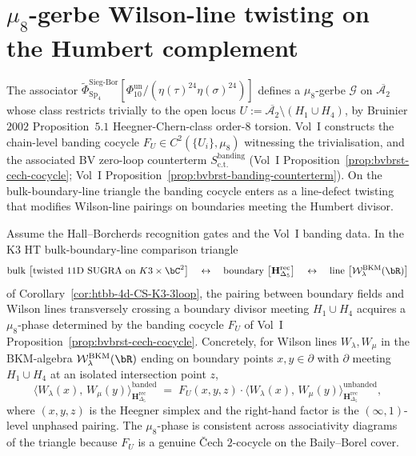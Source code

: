 \section{$\mu_8$-gerbe Wilson-line twisting on the Humbert complement}
\label{sec:htbb-mu8-wilson-twisting}

The associator
$\widetilde{\Phi}^{\mathrm{Sieg\text{-}Bor}}_{\mathrm{Sp}_4}
\!\left[\Phi_{10}^{\mathrm{un}}/
(\eta(\tau)^{24}\eta(\sigma)^{24})\right]$ defines a $\mu_8$-gerbe $\mathcal{G}$ on
$\overline{\mathcal{A}_2}$ whose class restricts trivially to the open
locus $U := \overline{\mathcal{A}_2}\setminus(H_1\cup H_4)$, by
Bruinier $2002$ Proposition~$5.1$ Heegner-Chern-class order-$8$
torsion. Vol~I constructs the chain-level banding cocycle
$F_U \in C^2(\{U_i\},\mu_8)$ witnessing the trivialisation, and the
associated BV zero-loop counterterm
$S^{\mathrm{banding}}_{\mathrm{c.t.}}$ \textup{(}Vol~I
Proposition~\ref{prop:bvbrst-cech-cocycle}; Vol~I
Proposition~\ref{prop:bvbrst-banding-counterterm}\textup{).}
On the bulk-boundary-line triangle the banding cocycle enters as a
line-defect twisting that modifies Wilson-line pairings on boundaries
meeting the Humbert divisor.

\begin{theorem}
\label{thm:htbb-W18-banding-wilson-line}
Assume the Hall--Borcherds recognition gates and the Vol~I banding data.
In the K3 HT bulk-boundary-line comparison triangle
\[
 \text{bulk } \bigl[\text{twisted 11D SUGRA on } K3\times\bC^2\bigr]
 \quad\leftrightarrow\quad
 \text{boundary } \bigl[\mathbf{H}_{\Delta_5}^{\mathrm{rec}}\bigr]
 \quad\leftrightarrow\quad
 \text{line } \bigl[\mathcal{W}^{\mathrm{BKM}}_\lambda(\bR)\bigr]
\]
of Corollary~\textup{\ref{cor:htbb-4d-CS-K3-3loop},} the pairing
between boundary fields and Wilson lines transversely crossing a
boundary divisor meeting $H_1 \cup H_4$ acquires a $\mu_8$-phase
determined by the banding cocycle $F_U$ of Vol~I
Proposition~\textup{\ref{prop:bvbrst-cech-cocycle}.}
Concretely, for Wilson lines $W_\lambda, W_\mu$ in the BKM-algebra
$\mathcal{W}^{\mathrm{BKM}}_\lambda(\bR)$ ending on boundary points
$x, y \in \partial$ with $\partial$ meeting $H_1 \cup H_4$ at an
isolated intersection point $z$,
\[
 \bigl\langle W_\lambda(x),\, W_\mu(y) \bigr\rangle^{\mathrm{banded}}_{\mathbf{H}_{\Delta_5}^{\mathrm{rec}}}
 \;=\; F_U(x, y, z)\cdot
 \bigl\langle W_\lambda(x),\, W_\mu(y) \bigr\rangle^{\mathrm{unbanded}}_{\mathbf{H}_{\Delta_5}^{\mathrm{rec}}},
\]
where $(x, y, z)$ is the Heegner simplex and the right-hand factor is
the $(\infty,1)$-level unphased pairing. The $\mu_8$-phase is
consistent across associativity diagrams of the triangle because
$F_U$ is a genuine \v Cech $2$-cocycle on the Baily--Borel cover.
\end{theorem}

